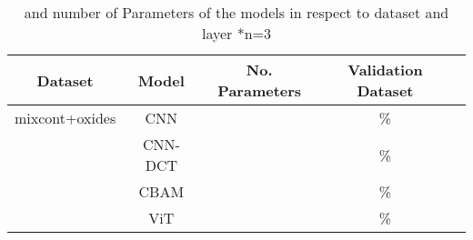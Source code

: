 \begin{table}[H]
    \centering
    \begin{tabular}{c|c|c|c|c}
        Dataset & Model   & No. Parameters & Validation Dataset      \\
        \hline
 mixcont+oxides& CNN     &                &        \%              \\
               & CNN-DCT &                &       \%               \\
               & CBAM    &                &       \%               \\
               & ViT     &                &       \%               \\

    \end{tabular}
    \caption{ and number of Parameters of the models in respect to dataset and layer
    *n=3}
    \label{tab:acc_depth}
\end{table}

